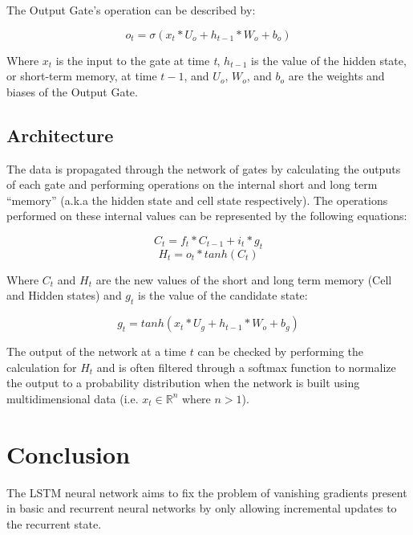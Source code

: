 \documentclass[12pt]{article}
\begin{document}
The Output Gate's operation can be described by:

\begin{equation}
    o_t = \sigma(x_t*U_o + h_{t-1}*W_o + b_o)
\end{equation}

Where $x_t$ is the input to the gate at time \emph{t}, $h_{t-1}$ is the value
of the hidden state, or short-term memory, at time $t - 1$, and $U_o$, $W_o$,
and $b_o$ are the weights and biases of the Output Gate.

\subsection{Architecture}

The data is propagated through the network of gates by calculating the outputs
of each gate and performing operations on the internal short and long term
``memory'' (a.k.a the hidden state and cell state respectively). The operations
performed on these internal values can be represented by the following
equations:

\begin{equation}
    C_t = f_t*C_{t-1} + i_t*g_t
\end{equation}
\begin{equation}
    H_t = o_t*tanh(C_t)
\end{equation}

Where $C_t$ and $H_t$ are the new values of the short and long term memory
(Cell and Hidden states) and $g_t$ is the value of the candidate state:

\begin{equation}
    g_t = tanh(x_t*U_g + h_{t-1}*W_o + b_g)
\end{equation}

The output of the network at a time $t$ can be checked by performing the
calculation for $H_t$ and is often filtered through a softmax function to
normalize the output to a probability distribution when the network is built
using multidimensional data (i.e. $x_t \in \mathbb{R}^n$ where $n > 1$).

\section{Conclusion}
The LSTM neural network aims to fix the problem of vanishing gradients present
in basic and recurrent neural networks by only allowing incremental updates to
the recurrent state.
\end{document}
